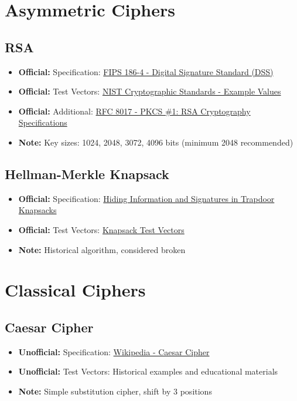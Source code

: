 \documentclass[12pt,a4paper]{article}
\newcommand{\official}[1]{\textcolor{citegreen}{\textbf{Official:}} #1}
\newcommand{\unofficial}[1]{\textcolor{warningred}{\textbf{Unofficial:}} #1}
\newcommand{\note}[1]{\textcolor{noteorange}{\textbf{Note:}} #1}
\newcommand{\link}[2]{\href{#1}{#2}}
\begin{document}
\newpage

\section{Asymmetric Ciphers}

\subsection{RSA}
\begin{itemize}
    \item \official{Specification:} \link{https://nvlpubs.nist.gov/nistpubs/FIPS/NIST.FIPS.186-4.pdf}{FIPS 186-4 - Digital Signature Standard (DSS)}
    \item \official{Test Vectors:} \link{https://csrc.nist.gov/Projects/cryptographic-standards-and-guidelines/example-values}{NIST Cryptographic Standards - Example Values}
    \item \official{Additional:} \link{https://tools.ietf.org/html/rfc8017}{RFC 8017 - PKCS \#1: RSA Cryptography Specifications}
    \item \note{Key sizes: 1024, 2048, 3072, 4096 bits (minimum 2048 recommended)}
\end{itemize}

\subsection{Hellman-Merkle Knapsack}
\begin{itemize}
    \item \official{Specification:} \link{https://link.springer.com/article/10.1007/BF02620229}{Hiding Information and Signatures in Trapdoor Knapsacks}
    \item \official{Test Vectors:} \link{https://link.springer.com/article/10.1007/BF02620229}{Knapsack Test Vectors}
    \item \note{Historical algorithm, considered broken}
\end{itemize}

\newpage

\section{Classical Ciphers}

\subsection{Caesar Cipher}
\begin{itemize}
    \item \unofficial{Specification:} \link{https://en.wikipedia.org/wiki/Caesar_cipher}{Wikipedia - Caesar Cipher}
    \item \unofficial{Test Vectors:} Historical examples and educational materials
    \item \note{Simple substitution cipher, shift by 3 positions}
\end{itemize}
\end{document}

